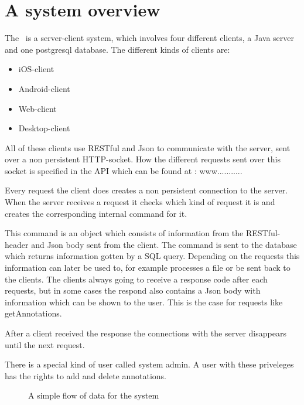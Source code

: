 
\section{A system overview}

The \appName\ is a server-client system, which involves four different clients, a Java server and one postgresql database. The different kinds of clients are:

\begin{itemize}
\item iOS-client
\item Android-client
\item Web-client
\item Desktop-client
\end{itemize}


All of these clients use RESTful and Json to communicate with the server, sent over a non persistent HTTP-socket. How the different requests sent over this socket is specified in the API which can be found at : www........... 

Every request the client does creates a non persistent connection to the server. When the server receives a request it checks which kind of request it is and creates the corresponding internal command for it.

This command is an object which consists of information from the RESTful-header and Json body sent from the client. The command is sent to the database which returns information gotten by a SQL query. Depending on the requests this information can later be used to, for example processes a file or be sent back to the clients. The clients always going to receive a response code after each requests, but in some cases the respond also contains a Json body with information which can be shown to the user. This is the case for requests like getAnnotations.

After a client received the response the connections with the server disappears until the next request. 

There is a special kind of user called system admin. A user with these priveleges has the rights to add and delete annotations.

\begin{figure}[t]
\caption{A simple flow of data for the system}
\label{fig:com_systemOverview}
\end{figure}